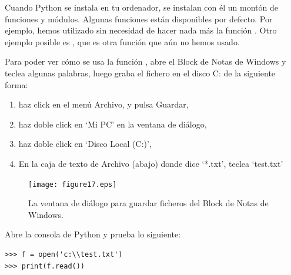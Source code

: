Cuando Python se instala en tu ordenador, se instalan con él un montón de funciones y módulos. Algunas funciones están disponibles por defecto.  Por ejemplo, hemos utilizado sin necesidad de hacer nada más la función .  Otro ejemplo posible es , que es otra función que aún no hemos usado.

\begin{WINDOWS}

Para poder ver cómo se usa la función , abre el Block de Notas de Windows y teclea algunas palabras, luego graba el fichero en el disco C: de la siguiente forma:

\begin{enumerate}
 \item haz click en el menú Archivo, y pulsa Guardar,
 \item haz doble click en `Mi PC' en la ventana de diálogo,
 \item haz doble click en `Disco Local (C:)',
 \item En la caja de texto de Archivo (abajo) donde dice `*.txt', teclea `test.txt' 
\end{enumerate}

\begin{figure}
\begin{center}
\texttt{[image: figure17.eps]}
\end{center}
\caption{La ventana de diálogo para guardar ficheros del Block de Notas de Windows.}\label{fig17}
\end{figure}

Abre la consola de Python y prueba lo siguiente:

\begin{listing}
\begin{verbatim}
>>> f = open('c:\\test.txt')
>>> print(f.read())
\end{verbatim}
\end{listing}

\end{WINDOWS}

